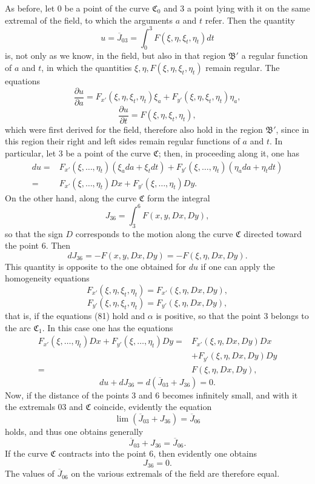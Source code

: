 \documentclass[11pt,a4paper,leqno]{article}
\begin{document}
As before, let 0 be a point of the curve $\mathfrak{C}_0$ and 3 a point lying with it on the same extremal of the field, to which the arguments $a$ and $t$ refer. Then the quantity
\[
u=\overline{J}_{03}=\int_0^3F(\xi,\eta,\xi_t,\eta_t)dt
\]
is, not only as we know, in the field, but also in that region $\mathfrak{B}'$ a regular function of $a$ and $t$, in which the quantities $\xi,\eta,F(\xi,\eta,\xi_t,\eta_t)$ remain regular. The equations
\[
\frac{\partial u}{\partial a}=F_{x'}(\xi,\eta,\xi_t,\eta_t)\xi_a
+F_{y'}(\xi,\eta,\xi_t,\eta_t)\eta_a,
\]
\[
\frac{\partial u}{\partial t}=F(\xi,\eta,\xi_t,\eta_t),
\]
which were first derived for the field, therefore also hold in the region $\mathfrak{B}'$, since in this region their right and left sides remain regular functions of $a$ and $t$. In particular, let 3 be a point of the curve $\mathfrak{C}$; then, in proceeding along it, one has
\[
\begin{aligned}
du={}&F_{x'}(\xi,\ldots,\eta_t)(\xi_a da+\xi_tdt)
+F_{y'}(\xi,\ldots,\eta_t)(\eta_ada+\eta_tdt)\\
={}&F_{x'}(\xi,\ldots,\eta_t)Dx+F_{y'}(\xi,\ldots,\eta_t)Dy.
\end{aligned}
\]
On the other hand, along the curve $\mathfrak{C}$ form the integral
\[
J_{36}=\int_3^6F(x,y,Dx,Dy),
\]
so that the sign $D$ corresponds to the motion along the curve $\mathfrak{C}$ directed toward the point 6. Then
\[
dJ_{36}=-F(x,y,Dx,Dy)=-F(\xi,\eta,Dx,Dy).
\]
This quantity is opposite to the one obtained for $du$ if one can apply the homogeneity equations
\[
F_{x'}(\xi,\eta,\xi_t,\eta_t)=F_{x'}(\xi,\eta,Dx,Dy),
\]
\[
F_{y'}(\xi,\eta,\xi_t,\eta_t)=F_{y'}(\xi,\eta,Dx,Dy),
\]
that is, if the equations (81) hold and $\alpha$ is positive, so that the point 3 belongs to the arc $\mathfrak{C}_1$. In this case one has the equations
\[
\begin{aligned}
F_{x'}(\xi,\ldots,\eta_t)Dx+F_{y'}(\xi,\ldots,\eta_t)Dy
={}&F_{x'}(\xi,\eta,Dx,Dy)Dx\\
&+F_{y'}(\xi,\eta,Dx,Dy)Dy\\
={}&F(\xi,\eta,Dx,Dy),
\end{aligned}
\]
\[
du+dJ_{36}=d(\overline{J}_{03}+J_{36})=0.
\]
Now, if the distance of the points 3 and 6 becomes infinitely small, and with it the extremals 03 and $\mathfrak{C}$ coincide, evidently the equation
\[
\lim(\overline{J}_{03}+J_{36})=\overline{J}_{06}
\]
holds, and thus one obtains generally
\begin{equation}\tag{82}
\overline{J}_{03}+J_{36}=\overline{J}_{06}.
\end{equation}
If the curve $\mathfrak{C}$ contracts into the point 6, then evidently one obtains
\[
J_{36}=0.
\]
The values of $\overline{J}_{06}$ on the various extremals of the field are therefore equal.
\end{document}
